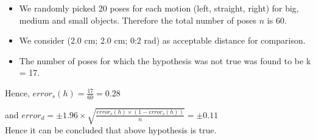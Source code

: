 \documentclass[10pt,a4paper]{article}
\begin{document}
					\begin{itemize}
						\item We randomly picked 20 poses for each motion (left, straight, right) for big, medium and small objects. Therefore the total number of poses $n$ is 60.
						
						\item We consider (2.0 cm; 2.0 cm; 0:2 rad) as acceptable distance for comparison.
						
						\item The number of poses for which the hypothesis was not true was found to be k = 17.
					\end{itemize}
					
					Hence, $error_s (h) = \frac{17}{60} = 0.28 $
					
					and $error_d = \pm 1.96 \times \sqrt{\frac{error_s (h) \times (1-error_s (h))}{n}} = \pm0.11$\\
					
					Hence it can be concluded that above hypothesis is true.
					
					
						
\end{document}
